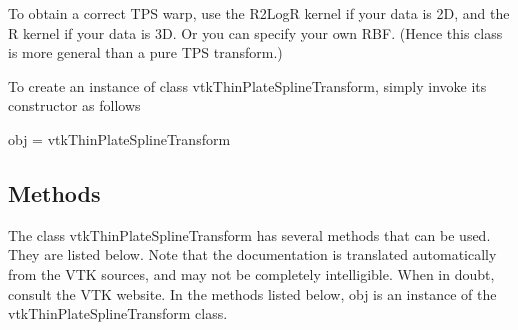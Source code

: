 To obtain a correct T\-P\-S warp, use the R2\-Log\-R kernel if your data is 2\-D, and the R kernel if your data is 3\-D. Or you can specify your own R\-B\-F. (Hence this class is more general than a pure T\-P\-S transform.)

To create an instance of class vtk\-Thin\-Plate\-Spline\-Transform, simply invoke its constructor as follows \begin{DoxyVerb}  obj = vtkThinPlateSplineTransform
\end{DoxyVerb}
 \hypertarget{vtkwidgets_vtkxyplotwidget_Methods}{}\subsection{Methods}\label{vtkwidgets_vtkxyplotwidget_Methods}
The class vtk\-Thin\-Plate\-Spline\-Transform has several methods that can be used. They are listed below. Note that the documentation is translated automatically from the V\-T\-K sources, and may not be completely intelligible. When in doubt, consult the V\-T\-K website. In the methods listed below, {\ttfamily obj} is an instance of the vtk\-Thin\-Plate\-Spline\-Transform class. 
